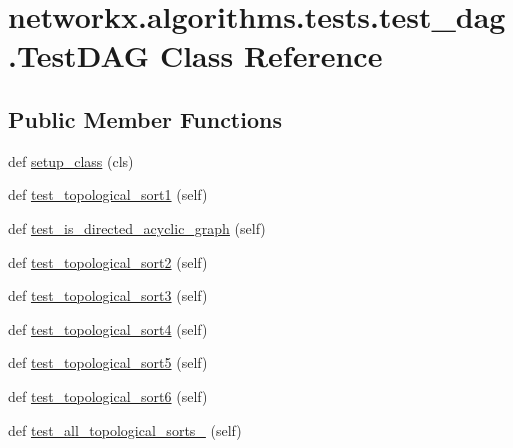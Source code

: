 \hypertarget{classnetworkx_1_1algorithms_1_1tests_1_1test__dag_1_1TestDAG}{}\section{networkx.\+algorithms.\+tests.\+test\+\_\+dag.\+Test\+D\+AG Class Reference}
\label{classnetworkx_1_1algorithms_1_1tests_1_1test__dag_1_1TestDAG}
\subsection*{Public Member Functions}
\begin{DoxyCompactItemize}
\item 
def \hyperlink{classnetworkx_1_1algorithms_1_1tests_1_1test__dag_1_1TestDAG_af0e8b55140b25230e0bde84ef0b9f7da}{setup\+\_\+class} (cls)
\item 
def \hyperlink{classnetworkx_1_1algorithms_1_1tests_1_1test__dag_1_1TestDAG_ae970750b1993ec966110d9d65c2c0a31}{test\+\_\+topological\+\_\+sort1} (self)
\item 
def \hyperlink{classnetworkx_1_1algorithms_1_1tests_1_1test__dag_1_1TestDAG_a7fa1b285e1412aba07fff734b634fe71}{test\+\_\+is\+\_\+directed\+\_\+acyclic\+\_\+graph} (self)
\item 
def \hyperlink{classnetworkx_1_1algorithms_1_1tests_1_1test__dag_1_1TestDAG_ac4035dcaca1b5c05e2d86d4617a86b3b}{test\+\_\+topological\+\_\+sort2} (self)
\item 
def \hyperlink{classnetworkx_1_1algorithms_1_1tests_1_1test__dag_1_1TestDAG_aa87ce25bd72f967fcc51607d188664d2}{test\+\_\+topological\+\_\+sort3} (self)
\item 
def \hyperlink{classnetworkx_1_1algorithms_1_1tests_1_1test__dag_1_1TestDAG_a01eca4f3b76d39209726db0a8bccfab4}{test\+\_\+topological\+\_\+sort4} (self)
\item 
def \hyperlink{classnetworkx_1_1algorithms_1_1tests_1_1test__dag_1_1TestDAG_a2cee7c12c831cf0194d0da6a2cbdad1d}{test\+\_\+topological\+\_\+sort5} (self)
\item 
def \hyperlink{classnetworkx_1_1algorithms_1_1tests_1_1test__dag_1_1TestDAG_ad854bbf8f0cde0858b1065b085cb47a6}{test\+\_\+topological\+\_\+sort6} (self)
\item 
def \hyperlink{classnetworkx_1_1algorithms_1_1tests_1_1test__dag_1_1TestDAG_aebcbdeb5293a016d22ba56d9edf0f526}{test\+\_\+all\+\_\+topological\+\_\+sorts\+\_} (self)
\item 

\end{DoxyCompactItemize}
